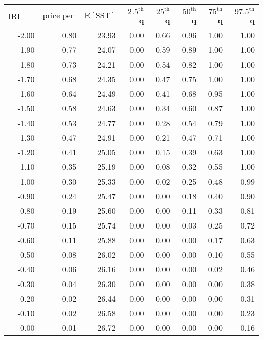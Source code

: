 \begin{table*}[ht]
\centering \footnotesize
\begin{tabular}{rrrrrrrr}
  \hline
$\mbox{IRI anom}$ & $\mbox{price per USD}$ & $\mbox{E}[\mbox{SST}]$ & $2.5^{\mbox{th}}$ q & $25^{\mbox{th}}$ q & $50^{\mbox{th}}$ q & $75^{\mbox{th}}$ q & $97.5^{\mbox{th}}$ q \\ 
  \hline
-2.00 & 0.80 & 23.93 & 0.00 & 0.66 & 0.96 & 1.00 & 1.00 \\ 
  -1.90 & 0.77 & 24.07 & 0.00 & 0.59 & 0.89 & 1.00 & 1.00 \\ 
  -1.80 & 0.73 & 24.21 & 0.00 & 0.54 & 0.82 & 1.00 & 1.00 \\ 
  -1.70 & 0.68 & 24.35 & 0.00 & 0.47 & 0.75 & 1.00 & 1.00 \\ 
  -1.60 & 0.64 & 24.49 & 0.00 & 0.41 & 0.68 & 0.95 & 1.00 \\ 
  -1.50 & 0.58 & 24.63 & 0.00 & 0.34 & 0.60 & 0.87 & 1.00 \\ 
  -1.40 & 0.53 & 24.77 & 0.00 & 0.28 & 0.54 & 0.79 & 1.00 \\ 
  -1.30 & 0.47 & 24.91 & 0.00 & 0.21 & 0.47 & 0.71 & 1.00 \\ 
  -1.20 & 0.41 & 25.05 & 0.00 & 0.15 & 0.39 & 0.63 & 1.00 \\ 
  -1.10 & 0.35 & 25.19 & 0.00 & 0.08 & 0.32 & 0.55 & 1.00 \\ 
  -1.00 & 0.30 & 25.33 & 0.00 & 0.02 & 0.25 & 0.48 & 0.99 \\ 
  -0.90 & 0.24 & 25.47 & 0.00 & 0.00 & 0.18 & 0.40 & 0.90 \\ 
  -0.80 & 0.19 & 25.60 & 0.00 & 0.00 & 0.11 & 0.33 & 0.81 \\ 
  -0.70 & 0.15 & 25.74 & 0.00 & 0.00 & 0.03 & 0.25 & 0.72 \\ 
  -0.60 & 0.11 & 25.88 & 0.00 & 0.00 & 0.00 & 0.17 & 0.63 \\ 
  -0.50 & 0.08 & 26.02 & 0.00 & 0.00 & 0.00 & 0.10 & 0.55 \\ 
  -0.40 & 0.06 & 26.16 & 0.00 & 0.00 & 0.00 & 0.02 & 0.46 \\ 
  -0.30 & 0.04 & 26.30 & 0.00 & 0.00 & 0.00 & 0.00 & 0.38 \\ 
  -0.20 & 0.02 & 26.44 & 0.00 & 0.00 & 0.00 & 0.00 & 0.31 \\ 
  -0.10 & 0.02 & 26.58 & 0.00 & 0.00 & 0.00 & 0.00 & 0.23 \\ 
  0.00 & 0.01 & 26.72 & 0.00 & 0.00 & 0.00 & 0.00 & 0.16 \\ 

\end{tabular}
\end{table*}
